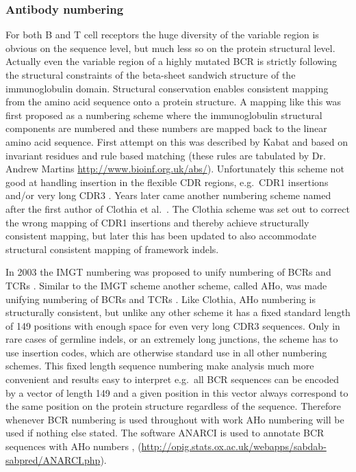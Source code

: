 \subsubsection{Antibody numbering}
For both B and T cell receptors the huge diversity of the variable region is obvious on the sequence level, but much less so on the protein structural level.
Actually even the variable region of a highly mutated BCR is strictly following the structural constraints of the beta-sheet sandwich structure of the immunoglobulin domain.
Structural conservation enables consistent mapping from the amino acid sequence onto a protein structure.
A mapping like this was first proposed as a numbering scheme where the immunoglobulin structural components are numbered and these numbers are mapped back to the linear amino acid sequence.
First attempt on this was described by Kabat \cite{national1983sequences} and based on invariant residues and rule based matching (these rules are tabulated by Dr. Andrew Martins \url{http://www.bioinf.org.uk/abs/}).
Unfortunately this scheme not good at handling insertion in the flexible CDR regions, e.g.\ CDR1 insertions and/or very long CDR3 \cite{martin2010protein}.
Years later came another numbering scheme named after the first author of Clothia et al.\ \cite{chothia1987canonical}.
The Clothia scheme was set out to correct the wrong mapping of CDR1 insertions and thereby achieve structurally consistent mapping, but later this has been updated to also accommodate structural consistent mapping of framework indels.

In 2003 the IMGT numbering was proposed to unify numbering of BCRs and TCRs \cite{lefranc2003imgt}.
Similar to the IMGT scheme another scheme, called AHo, was made unifying numbering of BCRs and TCRs \cite{honegger2001yet}.
Like Clothia, AHo numbering is structurally consistent, but unlike any other scheme it has a fixed standard length of 149 positions with enough space for even very long CDR3 sequences.
Only in rare cases of germline indels, or an extremely long junctions, the scheme has to use insertion codes, which are otherwise standard use in all other numbering schemes.
This fixed length sequence numbering make analysis much more convenient and results easy to interpret e.g.\ all BCR sequences can be encoded by a vector of length 149 and a given position in this vector always correspond to the same position on the protein structure regardless of the sequence.
Therefore whenever BCR numbering is used throughout with work AHo numbering will be used if nothing else stated.
The software ANARCI is used to annotate BCR sequences with AHo numbers \cite{dunbar2016anarci}, (\url{http://opig.stats.ox.ac.uk/webapps/sabdab-sabpred/ANARCI.php}).

